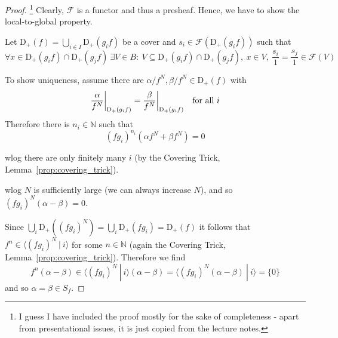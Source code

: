 \documentclass{scrartcl}
\newcommand{\N}{\mathbb{N}}
\newcommand{\D}[1]{\mathrm{D}_+(#1)}
\newcommand\restr[2]{{
    \left.\kern-\nulldelimiterspace
    #1
    \vphantom{\big|}
    \right|_{#2}
}}
\theoremstyle{definition}
\begin{document}
\begin{proof}\footnote{I guess I have included the proof mostly for the sake of completeness - apart from presentational issues, it is just copied from the lecture notes.}
    Clearly, $\mathcal{F}$ is a functor and thus a presheaf.
    Hence, we have to show the local-to-global property.

    Let $\D{f} = \bigcup_{i \in I} \D{g_if}$ be a cover and $s_i \in \mathcal{F}(\D{g_if})$ such that
    \begin{equation*}
        \forall x \in \D{g_if} \cap \D{g_jf} \ \exists V \in B: \ V \subseteq \D{g_if} \cap \D{g_jf}, \ x \in V, \ \frac {s_i} 1 = \frac {s_j} 1 \in \mathcal{F}(V)
    \end{equation*}

    To show uniqueness, assume there are $\alpha/f^N, \beta/f^N \in \D{f}$ with
    \begin{equation*}
        \restr{\frac {\alpha} {f^N}}{\D{g_if}} = \restr{\frac {\beta} {f^N}}{\D{g_if}} \quad \text{for all $i$}
    \end{equation*}
    Therefore there is $n_i \in \N$ such that
    \begin{equation*}
        (f g_i)^{n_i} (\alpha f^N + \beta f^N) = 0
    \end{equation*}

    wlog there are only finitely many $i$ (by the Covering Trick, Lemma~\ref{prop:covering_trick}).

    wlog $N$ is sufficiently large (we can always increase $N$), and so $(fg_i)^N(\alpha - \beta) = 0$.

    Since $\bigcup_i \D{(fg_i)^N} = \bigcup_i \D{fg_i} = \D{f}$ it follows that $f^n \in \langle (fg_i)^N \ | \ i \rangle$ for some $n \in \N$ (again the Covering Trick, Lemma~\ref{prop:covering_trick}).
    Therefore we find
    \begin{equation*}
        f^n(\alpha - \beta) \in \langle (f g_i)^N \ | \ i \rangle (\alpha - \beta) = \langle (f g_i)^N (\alpha - \beta) \ | \ i \rangle = \{ 0 \}
    \end{equation*}
    and so $\alpha = \beta \in S_f$.


\end{proof}
\end{document}

